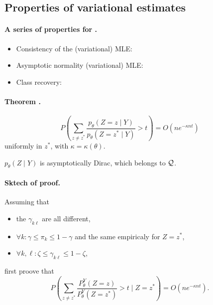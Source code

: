 \blank
\subsection{Properties of variational estimates}

\jump \paragraph{A series of properties for \SBMo.} 
\begin{itemize}
\item Consistency of the (variational) MLE: \citep{CDP12,BCC13}
\item Asymptotic normality (variational) MLE: \citep{BCC13}
\item Class recovery: \citep[][including LBM and zero-inflated SBM for the latter]{CDP12,MaM15} 
\end{itemize}

\jump \paragraph{Theorem \citep[3.1 in][]{CDP12}.} 
\begin{equation} \label{eq:CDP12}
P\left(\sum_{z \neq z^*} \frac{p_\theta(Z=z \mid Y)}{p_\theta(Z=z^* \mid Y)} > t \right) = O\left(n e^{-\kappa n t}\right)
\end{equation}
uniformly in $z^*$, with $\kappa = \kappa(\theta)$.

\ra $p_\theta(Z \mid Y)$ is asymptotically Dirac, which belongs to $\mathcal{Q}$.

\jump \paragraph{Sktech of proof.}
Assuming that
\begin{itemize}
 \item the $\gamma_{k\ell}$ are all different, 
 \item $\forall k: \gamma \leq \pi_k \leq 1 - \gamma$ and the same empiricaly for $Z=z^*$,
 \item $\forall k, \ell: \zeta \leq \gamma_{k\ell} \leq 1 - \zeta$,
\end{itemize}
first proove that
$$
P\left(\sum_{z \neq z^*} \frac{P_\theta^Y(Z=z)}{P_\theta^Y(Z=z^*)} > t \mid Z=z^*\right)
= O\left(n e^{-\kappa n t}\right).
$$ 

